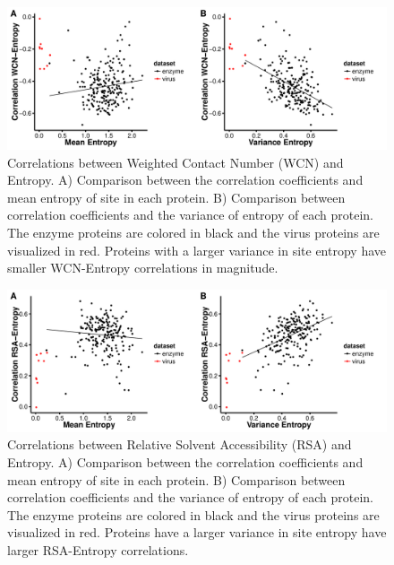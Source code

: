 \documentclass[12pt]{article}
\begin{document}
    \begin{figure}[H]
            \centerline{\includegraphics[width=7.5in]{entropy_wcn_cor.pdf}}     
            \caption{Correlations between Weighted Contact Number (WCN) and Entropy. A) Comparison between the correlation coefficients and mean entropy of site in each protein. B) Comparison between correlation coefficients and the variance of entropy of each protein. The enzyme proteins are colored in black and the virus proteins are visualized in red. Proteins with a larger variance in site entropy have smaller WCN-Entropy correlations in magnitude.}
            \label{fig:entropy_wcn_cor}
    \end{figure}

    \begin{figure}[H]
            \centerline{\includegraphics[width=7.5in]{entropy_rsa_cor.pdf}}     
            \caption{Correlations between Relative Solvent Accessibility (RSA) and Entropy. A) Comparison between the correlation coefficients and mean entropy of site in each protein. B) Comparison between correlation coefficients and the variance of entropy of each protein. The enzyme proteins are colored in black and the virus proteins are visualized in red. Proteins have a larger variance in site entropy have larger RSA-Entropy correlations.}
            \label{fig:entropy_rsa_cor}
    \end{figure}
        
\end{document}
